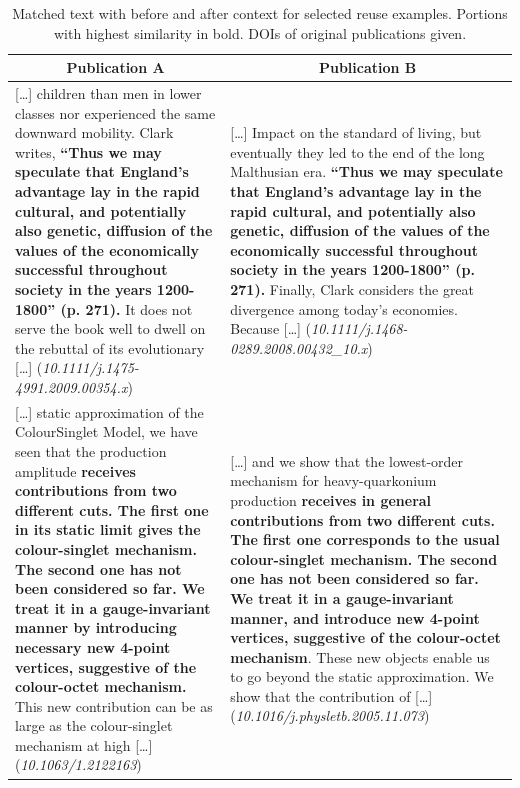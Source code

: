 \documentclass[fleqn,10pt]{wlscirep}
\begin{document}
\begin{table}[ht]
\caption{Matched text with before and after context for selected reuse examples. Portions with highest similarity in bold. DOIs of original publications given.}
\label{tab:example-cases}
\centering
\begin{tabular}{@{}p{}p{}@{}}
\toprule
\multicolumn{1}{c}{\textsf{\textbf{Publication A}}} & \multicolumn{1}{c}{\textsf{\textbf{Publication B}}} \\ \midrule

[\dots] children than men in lower classes nor experienced the same downward mobility. Clark writes, {\bfseries ``Thus we may speculate that England's advantage lay in the rapid cultural, and potentially also genetic, diffusion of the values of the economically successful throughout society in the years 1200-1800'' (p. 271).} It does not serve the book well to dwell on the rebuttal of its evolutionary [\dots] ({\itshape 10.1111/j.1475-4991.2009.00354.x})
& [\dots] Impact on the standard of living, but eventually they led to the end of the long Malthusian era. {\bfseries ``Thus we may speculate that England's advantage lay in the rapid cultural, and potentially also genetic, diffusion of the values of the economically successful throughout society in the years 1200-1800'' (p. 271).} Finally, Clark considers the great divergence among today's economies. Because [\dots] ({\itshape 10.1111/j.1468-0289.2008.00432\_10.x})
\\
\midrule

[\dots] static approximation of the ColourSinglet Model, we have seen that the production amplitude {\bfseries receives contributions from two different cuts. The first one in its static limit gives the colour-singlet mechanism. The second one has not been considered so far. We treat it in a gauge-invariant manner by introducing necessary new 4-point vertices, suggestive of the colour-octet mechanism.} This new contribution can be as large as the colour-singlet mechanism at high [\dots] ({\itshape 10.1063/1.2122163})
& [\dots] and we show that the lowest-order mechanism for heavy-quarkonium production {\bfseries receives in general contributions from two different cuts. The first one corresponds to the usual colour-singlet mechanism. The second one has not been considered so far. We treat it in a gauge-invariant manner, and introduce new 4-point vertices, suggestive of the colour-octet mechanism}. These new objects enable us to go beyond the static approximation. We show that the contribution of [\dots] ({\itshape 10.1016/j.physletb.2005.11.073})
\\
\midrule


\end{tabular}
\end{table}
\end{document}
